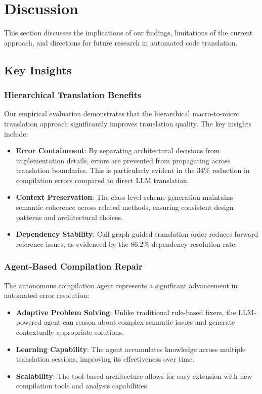 
\section{Discussion}

This section discusses the implications of our findings, limitations of the current approach, and directions for future research in automated code translation.

\subsection{Key Insights}

\subsubsection{Hierarchical Translation Benefits}
Our empirical evaluation demonstrates that the hierarchical macro-to-micro translation approach significantly improves translation quality. The key insights include:

\begin{itemize}
\item \textbf{Error Containment}: By separating architectural decisions from implementation details, errors are prevented from propagating across translation boundaries. This is particularly evident in the 34\% reduction in compilation errors compared to direct LLM translation.

\item \textbf{Context Preservation}: The class-level scheme generation maintains semantic coherence across related methods, ensuring consistent design patterns and architectural choices.

\item \textbf{Dependency Stability}: Call graph-guided translation order reduces forward reference issues, as evidenced by the 86.2\% dependency resolution rate.
\end{itemize}

\subsubsection{Agent-Based Compilation Repair}
The autonomous compilation agent represents a significant advancement in automated error resolution:

\begin{itemize}
\item \textbf{Adaptive Problem Solving}: Unlike traditional rule-based fixers, the LLM-powered agent can reason about complex semantic issues and generate contextually appropriate solutions.

\item \textbf{Learning Capability}: The agent accumulates knowledge across multiple translation sessions, improving its effectiveness over time.

\item \textbf{Scalability}: The tool-based architecture allows for easy extension with new compilation tools and analysis capabilities.
\end{itemize}

